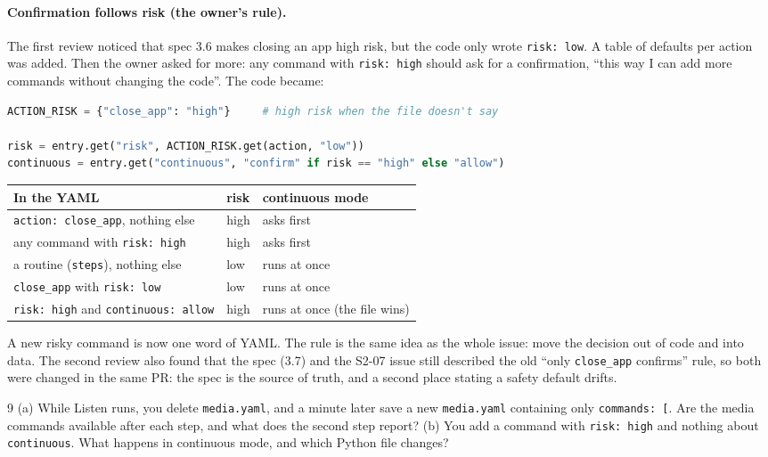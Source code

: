 \documentclass[11pt,a4paper]{article}
\begin{document}
\paragraph{Confirmation follows risk (the owner's rule).} The first review noticed that spec 3.6
makes closing an app high risk, but the code only wrote \texttt{risk: low}. A table of defaults
per action was added. Then the owner asked for more: any command with \texttt{risk: high} should
ask for a confirmation, ``this way I can add more commands without changing the code''. The code
became:
\begin{lstlisting}[language=Python]
ACTION_RISK = {"close_app": "high"}     # high risk when the file doesn't say

risk = entry.get("risk", ACTION_RISK.get(action, "low"))
continuous = entry.get("continuous", "confirm" if risk == "high" else "allow")
\end{lstlisting}
\begin{center}
\begin{tabularx}{\textwidth}{X l l}
\toprule
\textbf{In the YAML} & \textbf{risk} & \textbf{continuous mode} \\
\midrule
\texttt{action: close\_app}, nothing else & high & asks first \\
any command with \texttt{risk: high} & high & asks first \\
a routine (\texttt{steps}), nothing else & low & runs at once \\
\texttt{close\_app} with \texttt{risk: low} & low & runs at once \\
\texttt{risk: high} and \texttt{continuous: allow} & high & runs at once (the file wins) \\
\bottomrule
\end{tabularx}
\end{center}
\noindent A new risky command is now one word of YAML. The rule is the same idea as the whole
issue: move the decision out of code and into data. The second review also found that the spec
(3.7) and the S2-07 issue still described the old ``only \texttt{close\_app} confirms'' rule, so
both were changed in the same PR: the spec is the source of truth, and a second place stating a
safety default drifts.

\begin{quickcheck}{9}
(a) While Listen runs, you delete \texttt{media.yaml}, and a minute later save a new
\texttt{media.yaml} containing only \texttt{commands: [}. Are the media commands available after
each step, and what does the second step report? (b) You add a command with \texttt{risk: high}
and nothing about \texttt{continuous}. What happens in continuous mode, and which Python file
changes?
\end{quickcheck}
\end{document}
